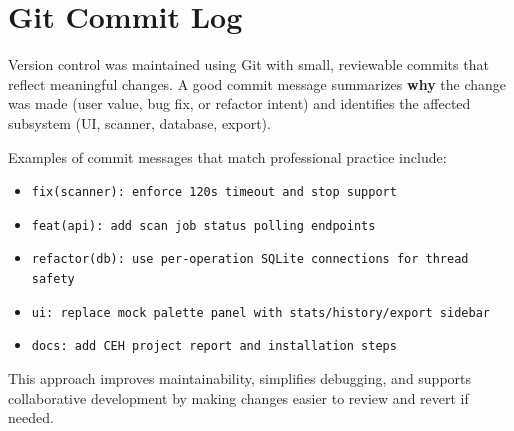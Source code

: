 \documentclass[12pt, a4paper]{report}
\begin{document}
\chapter{Git Commit Log}
\label{app:git}
Version control was maintained using Git with small, reviewable commits that reflect meaningful changes. A good commit message summarizes \textbf{why} the change was made (user value, bug fix, or refactor intent) and identifies the affected subsystem (UI, scanner, database, export).

Examples of commit messages that match professional practice include:
\begin{itemize}[leftmargin=2.2em]
  \item \texttt{fix(scanner): enforce 120s timeout and stop support}
  \item \texttt{feat(api): add scan job status polling endpoints}
  \item \texttt{refactor(db): use per-operation SQLite connections for thread safety}
  \item \texttt{ui: replace mock palette panel with stats/history/export sidebar}
  \item \texttt{docs: add CEH project report and installation steps}
\end{itemize}

This approach improves maintainability, simplifies debugging, and supports collaborative development by making changes easier to review and revert if needed.
\end{document}
